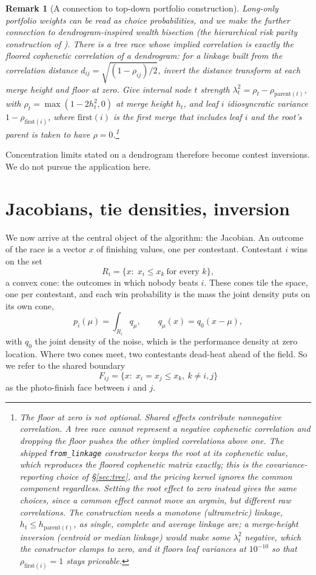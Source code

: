 \documentclass[11pt]{article}
\newtheorem{remark}{Remark}
\begin{document}
\begin{remark}[A connection to top-down portfolio construction]\label{rem:hrp}
Long-only portfolio weights can be read as choice probabilities, and we make the further connection to dendrogram-inspired wealth bisection (the hierarchical risk parity construction of \citet{lopezdeprado2016}).
There is a tree race whose implied correlation is exactly the
\emph{floored} cophenetic correlation of a dendrogram: for a linkage
built from the correlation distance $d_{ij}=\sqrt{(1-\rho_{ij})/2}$,
invert the distance transform at each merge height and floor at zero. Give internal node $t$ strength
$\lambda_t^2=\rho_t-\rho_{\mathrm{parent}(t)}$, with
$\rho_t=\max(1-2h_t^2,0)$ at merge height $h_t$, and leaf $i$
idiosyncratic variance $1-\rho_{\mathrm{first}(i)}$, where
$\mathrm{first}(i)$ is the first merge that includes leaf $i$ and the
root's parent is taken to have $\rho=0$.\footnote{The floor at zero is not optional. Shared effects contribute nonnegative
correlation. A tree race cannot represent a negative cophenetic
correlation and dropping the floor pushes the other implied correlations
above one. The shipped \texttt{from\_linkage} constructor keeps the root at its
cophenetic value, which reproduces the floored cophenetic matrix exactly;
this is the covariance-reporting choice of \S\ref{sec:tree}, and the
pricing kernel ignores the common component regardless. Setting the root
effect to zero instead gives the same choices, since a common effect
cannot move an argmin, but different raw correlations. The construction
needs a monotone (ultrametric) linkage, $h_t\le h_{\mathrm{parent}(t)}$,
as single, complete and average linkage are; a merge-height inversion
(centroid or median linkage) would make some $\lambda_t^2$ negative, which
the constructor clamps to zero, and it floors leaf variances at
$10^{-10}$ so that $\rho_{\mathrm{first}(i)}=1$ stays priceable.}
\end{remark}

Concentration limits stated on a dendrogram therefore become contest
inversions. We do not pursue the application here.

\section{Jacobians, tie densities, inversion}\label{sec:jac}

We now arrive at the central object of the algorithm: the Jacobian. An outcome of the race is a vector $x$ of finishing values, one per
contestant. Contestant $i$ wins on the set
\[
  R_i=\{x:\;x_i\le x_k\ \text{for every }k\},
\]
a convex cone: the outcomes in which nobody beats $i$. These cones tile
the space, one per contestant, and each win probability is the mass the
joint density puts on its own cone,
\[
  p_i(\mu)=\int_{R_i}q_\mu,\qquad q_\mu(x)=q_0(x-\mu),
\]
with $q_0$ the joint density of the noise, which is the performance
density at zero location.
Where two cones meet, two contestants dead-heat ahead of the field. So we refer to the
shared boundary
\[
  F_{ij}=\{x:\;x_i=x_j\le x_k,\ k\ne i,j\}
\]
as the photo-finish face between $i$ and $j$.
\end{document}
